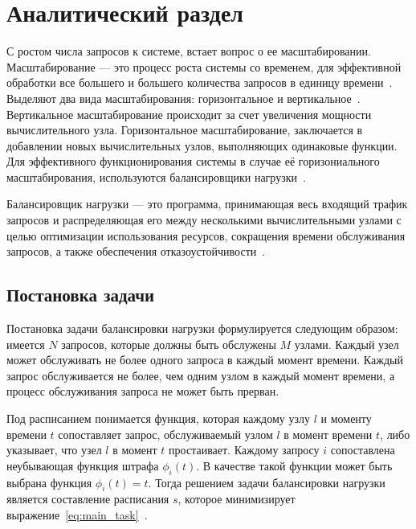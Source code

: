 

\chapter{Аналитический раздел}

С ростом числа запросов к системе, встает вопрос о ее масштабировании. 
Масштабирование --- это процесс роста системы со временем, для эффективной обработки все большего и большего количества запросов в единицу времени~\cite{scaling}. 
Выделяют два вида масштабирования: горизонтальное и вертикальное~\mbox{\cite{comp, part_algos, com_analysis}}.
Вертикальное масштабирование происходит за счет увеличения мощности вычислительного узла.  
Горизонтальное масштабирование, заключается в добавлении новых вычислительных узлов, выполняющих одинаковые функции.
Для эффективного функционирования системы в случае её горизониального масштабирования, используются балансировщики нагрузки~\cite{part_algos, comp}.

Балансировщик нагрузки --- это программа, принимающая весь
входящий трафик запросов и распределяющая его между несколькими
вычислительными узлами с целью оптимизации использования
ресурсов, сокращения времени обслуживания запросов, а также
обеспечения отказоустойчивости~\cite{comp}.


\section{Постановка задачи}

Постановка задачи балансировки нагрузки формулируется следующим образом:
имеется $N$ запросов, которые должны быть обслужены $M$ узлами.
Каждый узел может обслуживать не более одного запроса в каждый момент времени.
Каждый запрос обслуживается не более, чем одним узлом в каждый момент времени, а процесс обслуживания запроса не может быть прерван. 

Под расписанием понимается функция, которая каждому узлу $l$ и моменту времени $t$ сопоставляет запрос, обслуживаемый узлом $l$ в момент времени $t$, либо указывает, что узел $l$ в момент $t$ простаивает.
Каждому запросу $i$ сопоставлена неубывающая функция штрафа $\phi_i(t)$. В качестве такой функции может быть выбрана функция $\phi_i(t) = t$.
Тогда решением задачи балансировки нагрузки является составление расписания $s$, которое минимизирует выражение~\eqref{eq:main_task}~\cite{gaud}.

